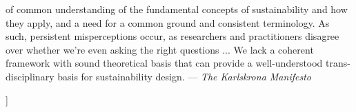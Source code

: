 \documentclass[11pt,twocolumn]{article}
\begin{document}
\begin{@twocolumnfalse}
\begin{lrbox}{\qboxii}
\begin{frquote}
of  common  understanding  of  the  fundamental  concepts  of
sustainability and how they apply, and a need for a common
ground and consistent terminology. As such, persistent 
misperceptions occur, as researchers and practitioners disagree over
whether we're even asking the right questions ...
We  lack  a  coherent  framework  with  sound  theoretical  basis
that can provide a well-understood trans-disciplinary basis for
sustainability design. --- \textit{The Karlskrona Manifesto} {\cite[p. 5]{Karlskrona}}
\end{frquote}
\end{lrbox}	
\vspace{1em}
\begin{flushright}%
\usebox{\qboxii}
\end{flushright}
\vspace{1em}
\decoline{}
\vspace{4em}
\end{@twocolumnfalse}]





%
%
%

%



\end{document}
